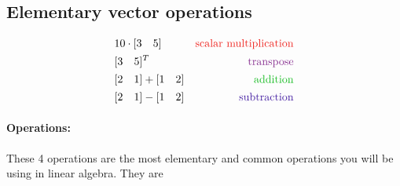 \documentclass{article}
\begin{document}
\color{white}
\subsection{Elementary vector operations}
\color{black}

\begin{align*}
&10 \cdot \irow{3 & 5} & \color{rooj} \textrm{scalar multiplication} \color{black} \\ 
&\irow{3 & 5}^T  & \color{pers} \textrm{transpose} \color{black}\\ 
&\irow{2 & 1} + \irow{1 & 2} &  \color{groen} \textrm{addition}\color{black}\\
&\irow{2 & 1} - \irow{1 & 2} &  \color{blou} \textrm{subtraction}\color{black}
\end{align*}

\paragraph{Operations: } These 4 operations are the most elementary and common operations you will be using in linear algebra. They are 
\end{document}
